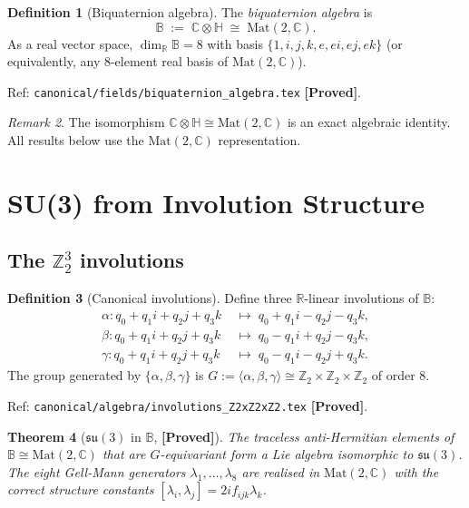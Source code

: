 \documentclass[12pt,a4paper]{article}
\newtheorem{theorem}{Theorem}[section]
\theoremstyle{definition}
\newtheorem{definition}[theorem]{Definition}
\theoremstyle{remark}
\newtheorem{remark}[theorem]{Remark}
\newcommand{\PROVED}{\textbf{[Proved]}}
\newcommand{\Bq}{\mathbb{C}\otimes\mathbb{H}}
\begin{document}
\begin{definition}[Biquaternion algebra]
\label{def:biquaternion}
The \emph{biquaternion algebra} is
\[
  \mathbb{B} \;:=\; \Bq \;\cong\; \mathrm{Mat}(2,\mathbb{C}).
\]
As a real vector space, $\dim_{\mathbb{R}}\mathbb{B} = 8$ with basis
$\{1, i, j, k, e, ei, ej, ek\}$ (or equivalently, any 8-element real basis
of $\mathrm{Mat}(2,\mathbb{C})$).

Ref: \texttt{canonical/fields/biquaternion\_algebra.tex} \PROVED.
\end{definition}

\begin{remark}
The isomorphism $\Bq \cong \mathrm{Mat}(2,\mathbb{C})$ is an exact algebraic
identity.  All results below use the $\mathrm{Mat}(2,\mathbb{C})$ representation.
\end{remark}

\section{SU(3) from Involution Structure}
\label{sec:su3}

\subsection{The $\mathbb{Z}_2^3$ involutions}

\begin{definition}[Canonical involutions]
\label{def:involutions}
Define three $\mathbb{R}$-linear involutions of $\mathbb{B}$:
\begin{align*}
\alpha : q_0 + q_1 i + q_2 j + q_3 k &\;\mapsto\; q_0 + q_1 i - q_2 j - q_3 k, \\
\beta  : q_0 + q_1 i + q_2 j + q_3 k &\;\mapsto\; q_0 - q_1 i + q_2 j - q_3 k, \\
\gamma : q_0 + q_1 i + q_2 j + q_3 k &\;\mapsto\; q_0 - q_1 i - q_2 j + q_3 k.
\end{align*}
The group generated by $\{\alpha,\beta,\gamma\}$ is
$G := \langle\alpha,\beta,\gamma\rangle \cong \mathbb{Z}_2\times\mathbb{Z}_2\times\mathbb{Z}_2$
of order 8.

Ref: \texttt{canonical/algebra/involutions\_Z2xZ2xZ2.tex} \PROVED.
\end{definition}

\begin{theorem}[$\mathfrak{su}(3)$ in $\mathbb{B}$, \PROVED]
\label{thm:su3_involutions}
The traceless anti-Hermitian elements of $\mathbb{B} \cong \mathrm{Mat}(2,\mathbb{C})$
that are $G$-equivariant form a Lie algebra isomorphic to $\mathfrak{su}(3)$.
The eight Gell-Mann generators $\lambda_1,\ldots,\lambda_8$ are realised in
$\mathrm{Mat}(2,\mathbb{C})$ with the correct structure constants
$[\lambda_i,\lambda_j] = 2i f_{ijk}\lambda_k$.
\end{theorem}
\end{document}
